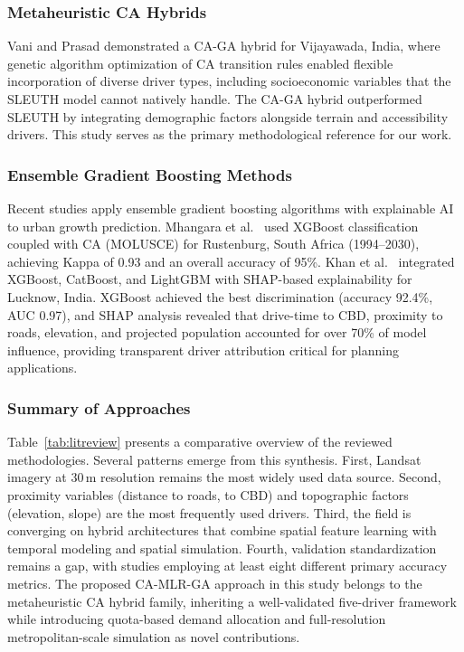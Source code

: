 \documentclass[12pt,a4paper]{article}
\begin{document}
\subsubsection{Metaheuristic CA Hybrids}
Vani and Prasad \cite{vani2022} demonstrated a CA-GA hybrid for Vijayawada, India, where genetic algorithm optimization of CA transition rules enabled flexible incorporation of diverse driver types, including socioeconomic variables that the SLEUTH model cannot natively handle. The CA-GA hybrid outperformed SLEUTH by integrating demographic factors alongside terrain and accessibility drivers. This study serves as the primary methodological reference for our work.

\subsubsection{Ensemble Gradient Boosting Methods}
Recent studies apply ensemble gradient boosting algorithms with explainable AI to urban growth prediction. Mhangara et al.\ \cite{mhangara2025} used XGBoost classification coupled with CA (MOLUSCE) for Rustenburg, South Africa (1994--2030), achieving Kappa of 0.93 and an overall accuracy of 95\%. Khan et al.\ \cite{khan2025} integrated XGBoost, CatBoost, and LightGBM with SHAP-based explainability for Lucknow, India. XGBoost achieved the best discrimination (accuracy 92.4\%, AUC 0.97), and SHAP analysis revealed that drive-time to CBD, proximity to roads, elevation, and projected population accounted for over 70\% of model influence, providing transparent driver attribution critical for planning applications.

\subsubsection{Summary of Approaches}
Table~\ref{tab:litreview} presents a comparative overview of the reviewed methodologies. Several patterns emerge from this synthesis. First, Landsat imagery at 30\,m resolution remains the most widely used data source. Second, proximity variables (distance to roads, to CBD) and topographic factors (elevation, slope) are the most frequently used drivers. Third, the field is converging on hybrid architectures that combine spatial feature learning with temporal modeling and spatial simulation. Fourth, validation standardization remains a gap, with studies employing at least eight different primary accuracy metrics. The proposed CA-MLR-GA approach in this study belongs to the metaheuristic CA hybrid family, inheriting a well-validated five-driver framework while introducing quota-based demand allocation and full-resolution metropolitan-scale simulation as novel contributions.
\end{document}
